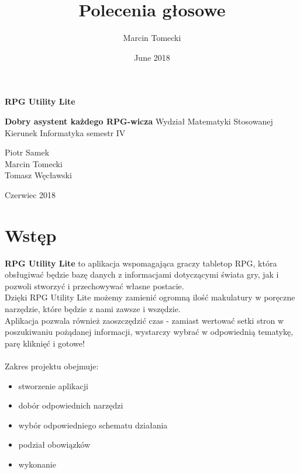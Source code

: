 \documentclass{article}
\title{Polecenia głosowe}
\author{Marcin Tomecki}
\date{June 2018}
\begin{document}
\begin{titlepage}
\centering
\Huge \textbf{RPG Utility Lite}\par
\Large \textbf{Dobry asystent każdego RPG-wicza}
\vfill
Wydział Matematyki Stosowanej\\Kierunek Informatyka semestr IV\par
\vfill
\vfill
\begin{flushright}
Piotr Samek\\
Marcin Tomecki\\
Tomasz Węcławski
\end{flushright}
Czerwiec 2018
\end{titlepage}
\tableofcontents
\newpage
\section{Wstęp}
\textbf{RPG Utility Lite} to aplikacja wspomagająca graczy tabletop RPG, która
obsługiwać będzie bazę danych z informacjami dotyczącymi świata gry, jak i pozwoli
stworzyć i przechowywać własne postacie.
\\Dzięki RPG Utility Lite możemy zamienić ogromną ilość makulatury w poręczne narzędzie, które będzie z nami zawsze i wszędzie.
\\Aplikacja pozwala również zaoszczędzić czas - zamiast wertować setki stron w poszukiwaniu pożądanej informacji, wystarczy wybrać w odpowiednią tematykę, parę kliknięć i gotowe!
\\\\Zakres projektu obejmuje:
\begin{itemize}
    \item stworzenie aplikacji
    \item dobór odpowiednich narzędzi
    \item wybór odpowiedniego schematu działania
    \item podział obowiązków
    \item wykonanie
\end{itemize}

\newpage
\end{document}
